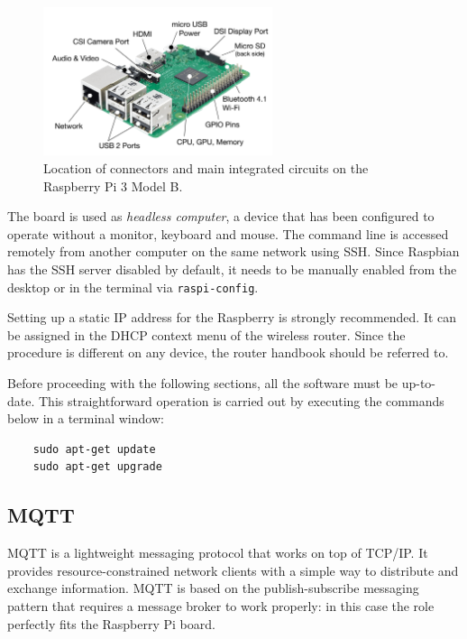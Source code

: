 \begin{figure}[H]
	\begin{center}
		\includegraphics[width=0.6\textwidth]{./pictures/rpi_connections.png}
		\caption{Location of connectors and main integrated circuits on the Raspberry Pi 3 Model B.}
		\label{rpi_connections}
	\end{center}
\end{figure}

\noindent
The board is used as \textit{headless computer}, a device that has been configured to operate without a monitor, keyboard and mouse. The command line is accessed remotely from another computer on the same network using SSH. Since Raspbian has the SSH server disabled by default, it needs to be manually enabled from the desktop or in the terminal via \texttt{raspi-config}.

Setting up a static IP address for the Raspberry is strongly recommended. It can be assigned in the DHCP context menu of the wireless router. Since the procedure is different on any device, the router handbook should be referred to.

Before proceeding with the following sections, all the software must be up-to-date. This straightforward operation is carried out by executing the commands below in a terminal window:

\begin{verbatim}
    sudo apt-get update
    sudo apt-get upgrade
\end{verbatim}

\subsection{MQTT}
MQTT is a lightweight messaging protocol that works on top of TCP/IP. It provides resource-constrained network clients with a simple way to distribute and exchange information. MQTT is based on the publish-subscribe messaging pattern that requires a message broker to work properly: in this case the role perfectly fits the Raspberry Pi board.

